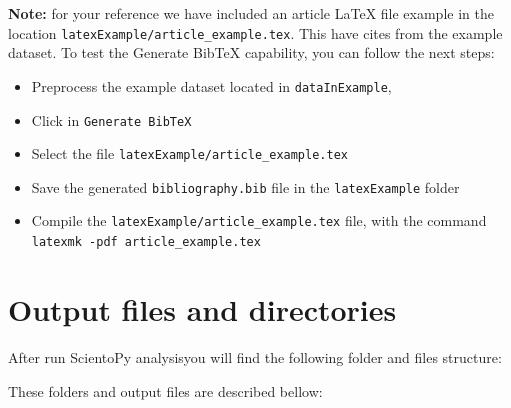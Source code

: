 \documentclass[10pt,letterpaper]{article}
\begin{document}
\textbf{Note:} for your reference we have included an article LaTeX file example in the location \verb|latexExample/article_example.tex|. This have cites from the example dataset. To test the Generate BibTeX capability, you can follow the next steps:
\begin{itemize}
\item Preprocess the example dataset located in \verb|dataInExample|, 
\item Click in \verb|Generate BibTeX| 
\item Select the file \verb|latexExample/article_example.tex| 
\item Save the generated \verb|bibliography.bib| file in the \verb|latexExample| folder 
\item Compile the \verb|latexExample/article_example.tex| file, with the command \verb|latexmk -pdf article_example.tex|
\end{itemize}

\section{Output files and directories}

After run ScientoPy analysisyou will find the following folder and files structure:

\vspace*{0.5cm}

These folders and output files are described bellow:
\end{document}
